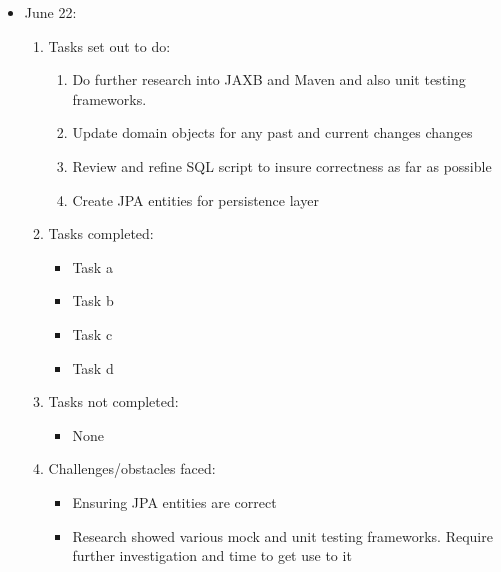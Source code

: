 \documentclass[12pt]{article}
\begin{document}
	\begin{itemize}
		\item June 22:
		\begin{enumerate}
			\item Tasks set out to do:
			\begin{enumerate}
				\item Do further research into JAXB and Maven and also unit testing frameworks.
				\item Update domain objects for any past and current changes changes
				\item Review and refine SQL script to insure correctness as far as possible
				\item Create JPA entities for persistence layer
			\end{enumerate}
			\item Tasks completed:
			\begin{itemize}
				\item Task a
				\item Task b
				\item Task c
				\item Task d
			\end{itemize}
			\item Tasks not completed:
			\begin{itemize}
				\item None
			\end{itemize}
			\item Challenges/obstacles faced:
			\begin{itemize}
				\item Ensuring JPA entities are correct
				\item Research showed various mock and unit testing frameworks. Require further investigation and time to get use to it 
			\end{itemize}			
		\end{enumerate}
	\end{itemize}
	
\end{document}

